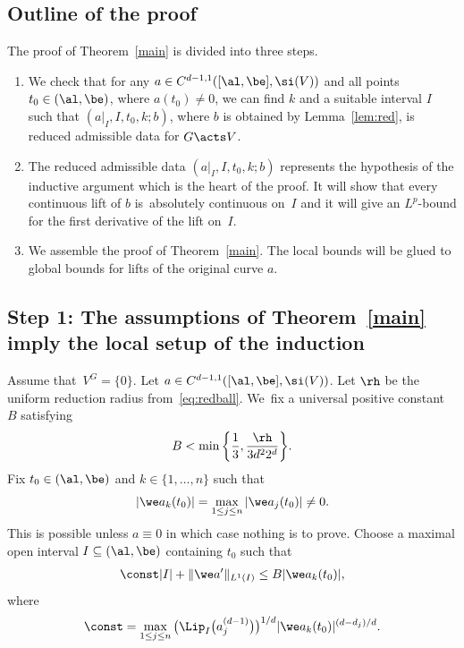 \subsection*{Outline of the proof}
The proof of Theorem~\ref{main} is divided into three steps.
\begin{enumerate}\itemsep=0pt
\setlength{\leftskip}{0.45cm}
 \item[{\it Step} 1:] We check that for any $a \in C^{d-1,1}([\al,\be],\si(V))$ and all points $t_0 \in (\al,\be)$, where \mbox{$a(t_0) \ne 0$},
 we can find $k$ and a suitable interval $I$ such that $(a|_I,I,t_0,k;b)$, where $b$ is obtained by Lemma~\ref{lem:red},
 is reduced admissible data for $G \acts V$.
 \item[{\it Step} 2:] The reduced admissible data $(a|_I,I,t_0,k;b)$ represents the hypothesis of the inductive argument which is the heart of the proof.
 It will show that every continuous lift of $b$ is~absolutely continuous on~$I$ and it will give an $L^p$-bound for the first derivative
 of the lift on~$I$.
 \item[{\it Step} 3:] We assemble the proof of Theorem~\ref{main}.
 The local bounds will be glued to global bounds for lifts of the original curve $a$.
 \end{enumerate}










\subsection*{Step 1: The assumptions of Theorem~\ref{main} imply the local setup of the induction}

Assume that~$V^G = \{0\}$.
Let $a \in C^{d-1,1}([\al,\be],\si(V))$. Let $\rh$ be the uniform reduction radius from~\eqref{eq:redball}. We~fix a universal positive constant $B$ satisfying
\begin{gather} \label{eq:constB}
 B < \min\bigg\{\frac1 3, \frac{\rh}{3 d^2 2^{d}}\bigg\}.
\end{gather}
Fix $t_0 \in (\al,\be)$ and $k \in \{1,\dots,n\}$ such that
\begin{gather} \label{k}
 |\we a_k(t_0)| = \max_{1 \le j \le n} |\we a_j(t_0)|\ne 0.
\end{gather}
This is possible unless $a \equiv 0$ in which case nothing is to prove.
Choose a maximal open interval $I \subseteq (\al,\be)$ containing $t_0$ such that
\begin{gather}\label{assumption<=}
\const |I| + \|\we a'\|_{L^1 (I)} \le B |\we a_k(t_0)|,
\end{gather}
where
\begin{gather} \label{M}
 \const = \max_{1 \le j\le n} \big(\Lip_I\big(a_j^{(d-1)}\big)\big)^{1/d} |\we a_k (t_0)|^{(d-d_j)/ d}.
\end{gather}

